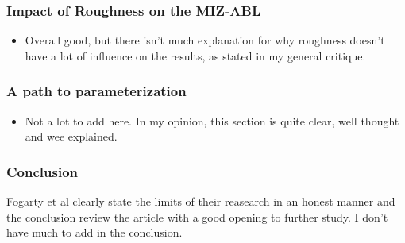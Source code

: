 \documentclass[10pt]{article}
\numberwithin{equation}{section}
\begin{document}
\subsubsection{Impact of Roughness on the MIZ-ABL}
\label{sec:orga9a83b5}
\begin{itemize}
\item Overall good, but there isn't much explanation for why roughness doesn't have a lot of influence on the results, as stated in my general critique.
\end{itemize}
\subsubsection{A path to parameterization}
\label{sec:org96ea3c4}
\begin{itemize}
\item Not a lot to add here. In my opinion, this section is quite clear, well thought and wee explained.
\end{itemize}
\subsubsection{Conclusion}
\label{sec:org80cec69}
Fogarty et al clearly state the limits of their reasearch in an honest manner and the conclusion review the article with a good opening to further study. I don't have much to add in the conclusion.
\end{document}

